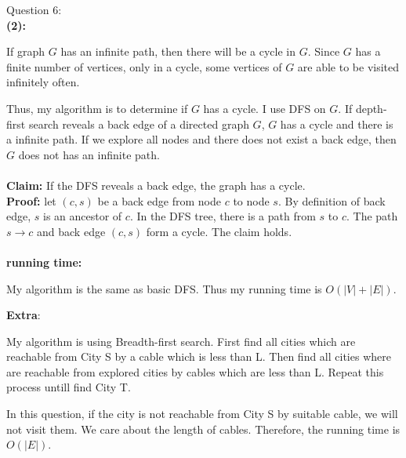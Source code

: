\documentclass[12pt]{article}
\begin{document}
\pagebreak
\noindent
\large Question 6: \\
\normalsize 
\setlength{\baselineskip}{8mm}
\noindent
\textbf{(2):} \par
If graph $G$ has an infinite path, then there will be a cycle in $G$.
Since $G$ has a finite number of vertices, only in a cycle, some vertices of $G$ are able to be visited infinitely often. \par
Thus, my algorithm is to determine if $G$ has a cycle.
I use DFS on $G$. If depth-first search reveals a back edge of a directed graph $G$, $G$ has a cycle and there is a infinite path. 
If we explore all nodes and there does not exist a back edge, then $G$ does not has an infinite path.   \\
\\
\textbf{Claim: } If the DFS reveals a back edge, the graph has a cycle.\\
\textbf{Proof: } let $(c, s)$ be a back edge from node $c$ to node $s$. By definition of back edge, $s$ is an ancestor of $c$.
In the DFS tree, there is a path from $s$ to $c$. The path $s \rightarrow c$ and back edge $(c, s)$ form a cycle. The claim holds. \\
\\
\textbf{running time:} \par
My algorithm is the same as basic DFS. Thus my running time is $O(|V| + |E|)$.



\pagebreak
\large \textbf{Extra}:\\ \vspace{5mm}\par
\normalsize 
\setlength{\baselineskip}{8mm}
My algorithm is using Breadth-first search. First find all cities which are reachable from City S by a cable which is less than L.
Then find all cities where are reachable from explored cities by cables which are less than L. 
Repeat this process untill find City T. \par
In this question, if the city is not reachable from City S by suitable cable, we will not visit them. We care about the length of cables. 
Therefore, the running time is $O(|E|)$.
\end{document}
